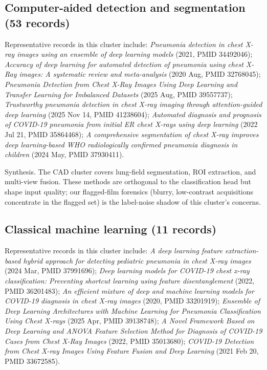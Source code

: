 \subsection*{Computer-aided detection and segmentation (53 records)}
Representative records in this cluster include: \emph{Pneumonia detection in chest X-ray images using an ensemble of deep learning models} (2021, PMID 34492046); \emph{Accuracy of deep learning for automated detection of pneumonia using chest X-Ray images: A systematic review and meta-analysis} (2020 Aug, PMID 32768045); \emph{Pneumonia Detection from Chest X-Ray Images Using Deep Learning and Transfer Learning for Imbalanced Datasets} (2025 Aug, PMID 39557737); \emph{Trustworthy pneumonia detection in chest X-ray imaging through attention-guided deep learning} (2025 Nov 14, PMID 41238604); \emph{Automated diagnosis and prognosis of COVID-19 pneumonia from initial ER chest X-rays using deep learning} (2022 Jul 21, PMID 35864468); \emph{A comprehensive segmentation of chest X-ray improves deep learning-based WHO radiologically confirmed pneumonia diagnosis in children} (2024 May, PMID 37930411).\par

Synthesis. The CAD cluster covers lung-field segmentation, ROI extraction, and multi-view fusion. These methods are orthogonal to the classification head but shape input quality; our flagged-film forensics (blurry, low-contrast acquisitions concentrate in the flagged set) is the label-noise shadow of this cluster's concerns.


\subsection*{Classical machine learning (11 records)}
Representative records in this cluster include: \emph{A deep learning feature extraction-based hybrid approach for detecting pediatric pneumonia in chest X-ray images} (2024 Mar, PMID 37991696); \emph{Deep learning models for COVID-19 chest x-ray classification: Preventing shortcut learning using feature disentanglement} (2022, PMID 36201483); \emph{An efficient mixture of deep and machine learning models for COVID-19 diagnosis in chest X-ray images} (2020, PMID 33201919); \emph{Ensemble of Deep Learning Architectures with Machine Learning for Pneumonia Classification Using Chest X-rays} (2025 Apr, PMID 39138748); \emph{A Novel Framework Based on Deep Learning and ANOVA Feature Selection Method for Diagnosis of COVID-19 Cases from Chest X-Ray Images} (2022, PMID 35013680); \emph{COVID-19 Detection from Chest X-ray Images Using Feature Fusion and Deep Learning} (2021 Feb 20, PMID 33672585).\par

